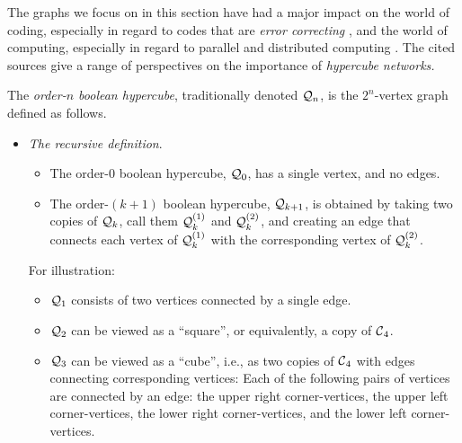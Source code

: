 The graphs we focus on in this section have had a major impact on the
world of coding, especially in regard to codes that are {\em error
  correcting} \cite{PetersonW81}, and the world of computing,
especially in regard to parallel and distributed computing
\cite{JohnssonH1989, SaadS89, Schwartz80}.  The cited sources give a
range of perspectives on the importance of {\it hypercube networks.}

The {\it order-$n$ boolean hypercube}, traditionally denoted $\mbox{$\cal Q$}_n$,
is the $2^n$-vertex graph defined as follows.
\begin{itemize}
\item
{\it The recursive definition}. 
  \begin{itemize}
  \item
The order-$0$ boolean hypercube, $\mbox{$\cal Q$}_0$, has a single vertex, and no
edges.
  \item
The order-$(k+1)$ boolean hypercube, $\mbox{$\cal Q$}_{k+1}$, is obtained by taking
two copies of $\mbox{$\cal Q$}_k$, call them $\mbox{$\cal Q$}_k^{(1)}$ and $\mbox{$\cal Q$}_k^{(2)}$, and
creating an edge that connects each vertex of $\mbox{$\cal Q$}_k^{(1)}$ with the
corresponding vertex of $\mbox{$\cal Q$}_k^{(2)}$.
  \end{itemize}
For illustration:
  \begin{itemize}
  \item
$\mbox{$\cal Q$}_1$ consists of two vertices connected by a single edge.
  \item
$\mbox{$\cal Q$}_2$ can be viewed as a ``square'', or equivalently, a copy of $\mbox{$\cal C$}_4$.
  \item
$\mbox{$\cal Q$}_3$ can be viewed as a ``cube'', i.e., as two copies of $\mbox{$\cal C$}_4$
    with edges connecting corresponding vertices: Each of the following
    pairs of vertices are connected by an edge: the upper right
    corner-vertices, the upper left corner-vertices, the lower right
    corner-vertices, and the lower left corner-vertices.
  \end{itemize}


\end{itemize}
